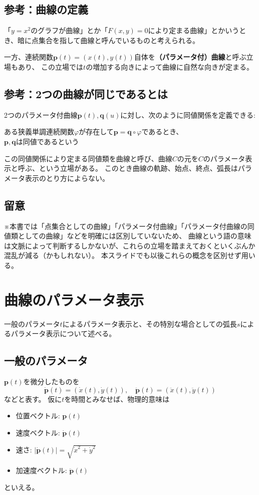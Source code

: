 \documentclass[a4j,disablejfam,dvipdfmx,papersize,slide,uplatex,21pt]{jsarticle}
\begin{document}
\newpage
\subsection*{参考：曲線の定義}
「$y=x^2$のグラフが曲線」とか「$F(x,y)=0$により定まる曲線」とかいうとき、暗に点集合を指して曲線と呼んでいるものと考えられる。

一方、連続関数$\bm{p}(t) = (x(t), y(t))$自体を\textbf{（パラメータ付）曲線}と呼ぶ立場もあり、
この立場では$t$の増加する向きによって曲線に自然な向きが定まる。

\newpage
\subsection*{参考：2つの曲線が同じであるとは}
2つのパラメータ付曲線$\bm{p}(t), \bm{q}(u)$に対し、次のように同値関係を定義できる:
\begin{center}
    ある狭義単調連続関数$\varphi$が存在して$\bm{p} = \bm{q} \circ \varphi$であるとき、\\
    $\bm{p}, \bm{q}$は同値であるという
\end{center}
この同値関係により定まる同値類を曲線と呼び、曲線$C$の元を$C$のパラメータ表示と呼ぶ、という立場がある。
このとき曲線の軌跡、始点、終点、弧長はパラメータ表示のとり方によらない。

\newpage
\subsection*{留意}
※本書では「点集合としての曲線」「パラメータ付曲線」「パラメータ付曲線の同値類としての曲線」などを明確には区別していないため、
曲線という語の意味は文脈によって判断するしかないが、これらの立場を踏まえておくといくぶんか混乱が減る（かもしれない）。
本スライドでも以後これらの概念を区別せず用いる。




\section{曲線のパラメータ表示}
一般のパラメータ$t$によるパラメータ表示と、その特別な場合としての弧長$s$によるパラメータ表示について述べる。

\newpage
\subsection*{一般のパラメータ}
$\bm{p}(t)$を微分したものを
\begin{equation}
    \dot{\bm{p}}(t) = (\dot{x}(t), \dot{y}(t)),\quad
    \ddot{\bm{p}}(t) = (\ddot{x}(t), \ddot{y}(t))
\end{equation}
などと表す。
仮に$t$を時間とみなせば、物理的意味は
\begin{itemize}
    \item 位置ベクトル: $\bm{p}(t)$
    \item 速度ベクトル: $\bm{\dot{p}}(t)$
    \item 速さ: $|\dot{\bm{p}}(t)| = \sqrt{\dot{x}^2 + \dot{y}^2}$
    \item 加速度ベクトル: $\bm{\ddot{p}}(t)$
\end{itemize}
といえる。
\end{document}
